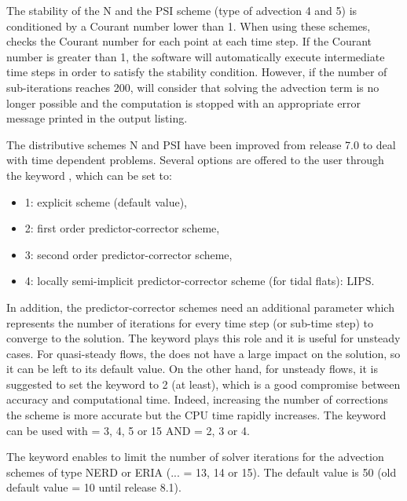 The stability of the N and the PSI scheme (type of advection 4 and 5)
is conditioned by a Courant number lower than 1.
When using these schemes,  checks the Courant number
for each point at each time step.
If the Courant number is greater than 1, the software will automatically execute
intermediate time steps in order to satisfy the stability condition.
However, if the number of sub-iterations reaches 200,  will consider
that solving the advection term is no longer possible and the computation is
stopped with an appropriate error message printed in the output listing.

The distributive schemes N and PSI have been improved from release 7.0 to deal
with time dependent problems. Several options are offered to the user through
the keyword , which can be set to:
\begin{itemize}
\item 1: explicit scheme (default value),
\item 2: first order predictor-corrector scheme,
\item 3: second order predictor-corrector scheme,
\item 4: locally semi-implicit predictor-corrector scheme
(for tidal flats): LIPS.
\end{itemize}
In addition, the predictor-corrector schemes need an additional parameter
which represents the number of iterations for every time step (or sub-time step)
to converge to the solution.
The keyword 
plays this role and it is useful for unsteady cases.
For quasi-steady flows, the
does not have a large impact on the solution, so it can be left to its default value.
On the other hand, for unsteady flows, it is suggested to set the keyword
 to 2 (at least),
which is a good compromise between accuracy and computational time.
Indeed, increasing the number of corrections the scheme is more accurate
but the CPU time rapidly increases.
The keyword 
can be used with
 = 3, 4, 5 or 15 AND
 = 2, 3 or 4.

The keyword 
enables to limit the number of solver iterations for the advection schemes
of type NERD or ERIA (... = 13, 14 or 15).
The default value is 50 (old default value = 10 until release 8.1).

